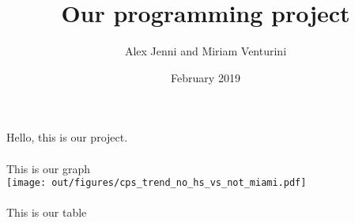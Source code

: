 \documentclass[10pt,a4paper]{article}
\title{Our programming project}
\date{February 2019}
\author{Alex Jenni and Miriam Venturini}
\begin{document}
\maketitle
\newpage
Hello, this is our project. \\\\
This is our graph \\
\texttt{[image: out/figures/cps\_trend\_no\_hs\_vs\_not\_miami.pdf]}
\\\\
This is our table  \\

\end{document}
